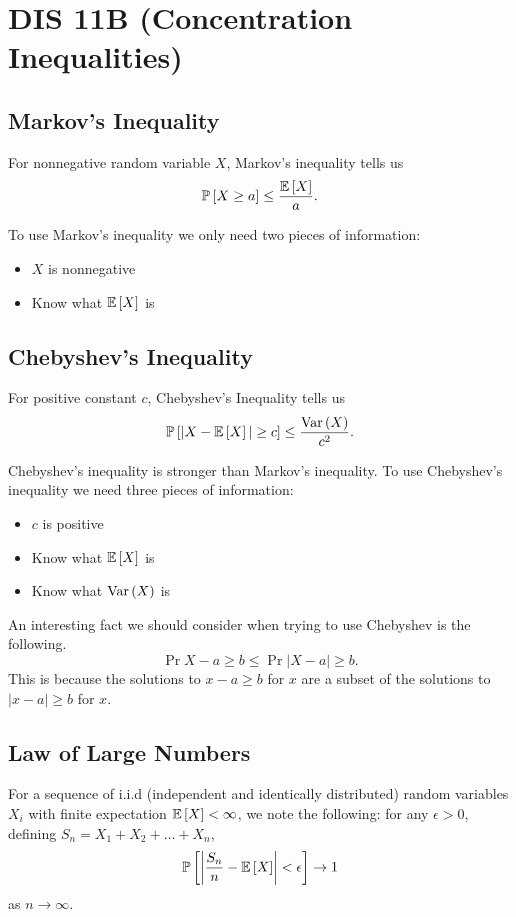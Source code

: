 \section{DIS 11B (Concentration Inequalities)}

\subsection{Markov's Inequality}
For nonnegative random variable $X$, Markov's inequality tells us \[ \mathbb{P}\left[ X \ge a \right] \le \frac{\mathbb{E}\left[ X \right]}{a}. \]

To use Markov's inequality we only need two pieces of information:
\begin{itemize}
    \item $X$ is nonnegative 
    \item Know what $\mathbb{E}\left[ X \right]$ is
\end{itemize}

\subsection{Chebyshev's Inequality}
For positive constant $c$, Chebyshev's Inequality tells us \[ \mathbb{P}\left[ |X-\mathbb{E}\left[ X \right]| \ge c \right] \le \frac{\text{Var}\left( X \right)}{c^2}. \]

Chebyshev's inequality is stronger than Markov's inequality. 
To use Chebyshev's inequality we need three pieces of information:
\begin{itemize}
    \item $c$ is positive
    \item Know what $\mathbb{E}\left[ X \right]$ is
    \item Know what $\text{Var}\left( X \right)$ is
\end{itemize}

An interesting fact we should consider when trying to use Chebyshev is the following. \[ \Pr{X - a \ge b} \le \Pr{|X-a| \ge b}. \] This is because the solutions to $x - a \ge b$ for $x$ are a subset of the solutions to $|x-a| \ge b$ for $x$. 

\subsection{Law of Large Numbers}

\begin{theorem}
    For a sequence of i.i.d (independent and identically distributed) random variables $X_i$ with finite expectation $\mathbb{E}\left[ X \right] < \infty$, we note the following: for any $\epsilon > 0$, defining $S_n = X_1 + X_2 + \ldots + X_n$, \[ \mathbb{P}\left[ \left|\frac{S_n}{n} - \mathbb{E}\left[ X \right]\right| < \epsilon \right] \to 1 \] as $n \to \infty$. 
\end{theorem}